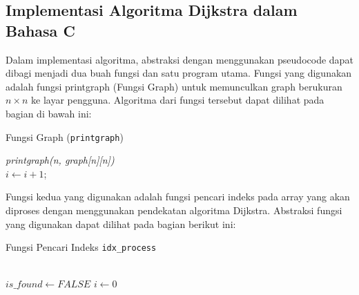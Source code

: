 \documentclass[conference]{IEEEtran}
\begin{document}
\subsection{Implementasi Algoritma Dijkstra dalam Bahasa C}
Dalam implementasi algoritma, abstraksi dengan menggunakan pseudocode dapat dibagi menjadi dua buah fungsi dan satu program utama.
Fungsi yang digunakan adalah fungsi printgraph (Fungsi Graph) untuk memunculkan graph berukuran $n \times n$ ke layar pengguna.
Algoritma dari fungsi tersebut dapat dilihat pada bagian di bawah ini:
\begin{algorithm}
    \caption{Fungsi Graph (\texttt{printgraph})}
     \textit{printgraph(n, graph[n][n])} \\
    $i \leftarrow i + 1$;
\end{algorithm}

Fungsi kedua yang digunakan adalah fungsi pencari indeks pada array yang akan diproses dengan menggunakan pendekatan algoritma Dijkstra.
Abstraksi fungsi yang digunakan dapat dilihat pada bagian berikut ini:
\begin{algorithm}
    \caption{Fungsi Pencari Indeks \texttt{idx\_process}}
     \\
    $is\_found \leftarrow FALSE$\;
    $i \leftarrow 0$\;
     \\
\end{algorithm}
\end{document}
